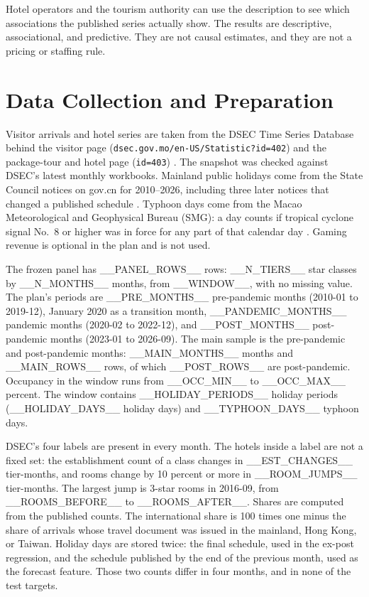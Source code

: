 \documentclass[11pt,a4paper]{article}
\begin{document}
Hotel operators and the tourism authority can use the description to see which associations the published series actually show. The results are descriptive, associational, and predictive. They are not causal estimates, and they are not a pricing or staffing rule.

\section{Data Collection and Preparation}
Visitor arrivals and hotel series are taken from the DSEC Time Series Database behind the visitor page (\texttt{dsec.gov.mo/en-US/Statistic?id=402}) \cite{dsec_visitors} and the package-tour and hotel page (\texttt{id=403}) \cite{dsec_hotels}. The snapshot was checked against DSEC's latest monthly workbooks. Mainland public holidays come from the State Council notices on gov.cn for 2010--2026, including three later notices that changed a published schedule \cite{statecouncil_holidays}. Typhoon days come from the Macao Meteorological and Geophysical Bureau (SMG): a day counts if tropical cyclone signal No.~8 or higher was in force for any part of that calendar day \cite{smg_tc}. Gaming revenue is optional in the plan and is not used.

The frozen panel has __PANEL_ROWS__ rows: __N_TIERS__ star classes by __N_MONTHS__ months, from __WINDOW__, with no missing value. The plan's periods are __PRE_MONTHS__ pre-pandemic months (2010-01 to 2019-12), January 2020 as a transition month, __PANDEMIC_MONTHS__ pandemic months (2020-02 to 2022-12), and __POST_MONTHS__ post-pandemic months (2023-01 to 2026-09). The main sample is the pre-pandemic and post-pandemic months: __MAIN_MONTHS__ months and __MAIN_ROWS__ rows, of which __POST_ROWS__ are post-pandemic. Occupancy in the window runs from __OCC_MIN__ to __OCC_MAX__ percent. The window contains __HOLIDAY_PERIODS__ holiday periods (__HOLIDAY_DAYS__ holiday days) and __TYPHOON_DAYS__ typhoon days.

DSEC's four labels are present in every month. The hotels inside a label are not a fixed set: the establishment count of a class changes in __EST_CHANGES__ tier-months, and rooms change by 10 percent or more in __ROOM_JUMPS__ tier-months. The largest jump is 3-star rooms in 2016-09, from __ROOMS_BEFORE__ to __ROOMS_AFTER__. Shares are computed from the published counts. The international share is 100 times one minus the share of arrivals whose travel document was issued in the mainland, Hong Kong, or Taiwan. Holiday days are stored twice: the final schedule, used in the ex-post regression, and the schedule published by the end of the previous month, used as the forecast feature. Those two counts differ in four months, and in none of the test targets.
\end{document}
